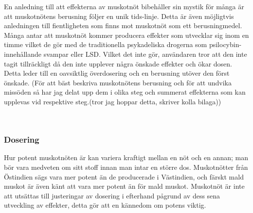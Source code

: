 En anledning till att effekterna av muskotnöt bibehåller sin mystik för många är att muskotnötens berusning följer en unik tids-linje. Detta är även möjligtvis anledningen till fientligheten som finns mot muskotnöt som ett berusningmedel. Många antar att muskotnöt kommer producera effekter som utvecklar sig inom en timme vilket de gör med de traditionella psykadeliska drogerna som psilocybin-innehållande svampar eller LSD. Vilket det inte gör, användaren tror att den inte tagit tillräckligt då den inte upplever några önskade effekter och ökar dosen. Detta leder till en oavsiktlig överdosering och en berusning utöver den först önskade. (För att bäst beskriva muskotnötens berusning och för att undvika missöden så har jag delat upp dem i olika steg och summerat effekterna som kan upplevas vid respektive steg.(tror jag hoppar detta, skriver kolla bilaga))

\\











\subsubsection{Dosering}
Hur potent muskotnöten är kan variera kraftigt mellan en nöt och en annan;
man bör vara medveten om sitt stoff innan man intar en större dos.
Muskotnötter från Östindien sägs vara mer potent än de producerade i Västindien, och färskt
mald muskot är även känt att vara mer potent än för mald muskot.\cite{entheogenreview}
Muskotnöt är inte att utsättas till justeringar av dosering i efterhand pågrund
av dess sena utveckling av effekter, detta gör att en kännedom om potens viktig.
\cite{entheogenreview}

